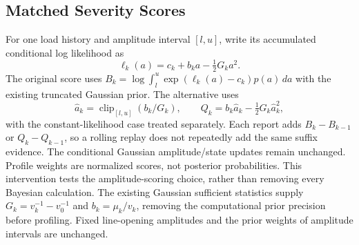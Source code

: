 \subsection{Matched Severity Scores}
For one load history and amplitude interval $[l,u]$, write its accumulated
conditional log likelihood as
\begin{equation}
 \ell_k(a)=c_k+b_k a-\tfrac12 G_k a^2.
 \label{eq:ablation-quadratic}
\end{equation}
The original score uses $B_k=\log\int_l^u
\exp(\ell_k(a)-c_k)p(a)\,da$ with the existing truncated Gaussian prior.
The alternative uses
\begin{equation}
 \widehat a_k=\operatorname{clip}_{[l,u]}(b_k/G_k),\qquad
 Q_k=b_k\widehat a_k-\tfrac12G_k\widehat a_k^2,
 \label{eq:ablation-profile}
\end{equation}
with the constant-likelihood case treated separately. Each report adds
$B_k-B_{k-1}$ or $Q_k-Q_{k-1}$, so a rolling replay does not repeatedly
add the same suffix evidence. The conditional Gaussian amplitude/state
updates remain unchanged. Profile weights are normalized scores, not
posterior probabilities. This intervention tests the amplitude-scoring
choice, rather than removing every Bayesian calculation.
The existing Gaussian sufficient statistics supply
$G_k=v_k^{-1}-v_0^{-1}$ and $b_k=\mu_k/v_k$, removing the computational
prior precision before profiling. Fixed line-opening amplitudes and the
prior weights of amplitude intervals are unchanged.
